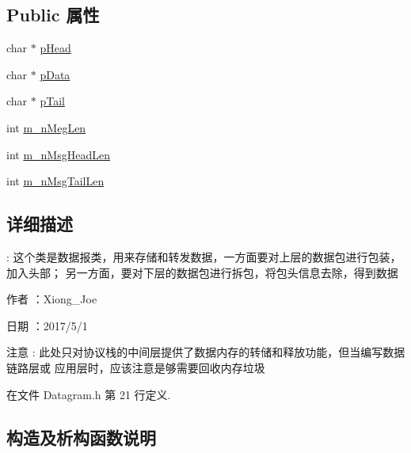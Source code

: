 \subsection*{Public 属性}
\begin{DoxyCompactItemize}
\item 
char $\ast$ \hyperlink{class_datagram_ac71eedd18cac5107f545043abd2d2655}{p\+Head}
\item 
char $\ast$ \hyperlink{class_datagram_a50bba5269b8d107e9be3147f28a9229c}{p\+Data}
\item 
char $\ast$ \hyperlink{class_datagram_af4d0826f99eb27b443a48ddc21e6815f}{p\+Tail}
\item 
int \hyperlink{class_datagram_aab7f89c5363d398b03ae8f8709e3e8c6}{m\+\_\+n\+Meg\+Len}
\item 
int \hyperlink{class_datagram_afeb0a8abee7a260fc81f2cdf8978e0b2}{m\+\_\+n\+Msg\+Head\+Len}
\item 
int \hyperlink{class_datagram_aaa9c1b32f5fb0414778af41cc01a6b9f}{m\+\_\+n\+Msg\+Tail\+Len}
\end{DoxyCompactItemize}


\subsection{详细描述}
\+: 这个类是数据报类，用来存储和转发数据，一方面要对上层的数据包进行包装，加入头部； 另一方面，要对下层的数据包进行拆包，将包头信息去除，得到数据 

\begin{DoxyAuthor}{作者}
：\+Xiong\+\_\+\+Joe 
\end{DoxyAuthor}
\begin{DoxyDate}{日期}
：2017/5/1 
\end{DoxyDate}
\begin{DoxyAttention}{注意}
\+: 此处只对协议栈的中间层提供了数据内存的转储和释放功能，但当编写数据链路层或 应用层时，应该注意是够需要回收内存垃圾 
\end{DoxyAttention}


在文件 Datagram.\+h 第 21 行定义.



\subsection{构造及析构函数说明}
\mbox{\label{class_datagram_a0935aec339a27b847c87dc6120613594}} 
